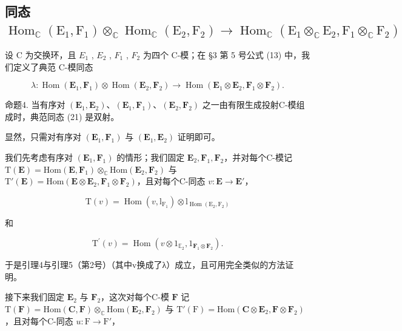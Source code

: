 \subsection{\texorpdfstring{同态 \(\operatorname{Hom}_{\mathbb{C}}(\mathrm{E}_1, \mathrm{F}_1) \otimes_{\mathbb{C}} \operatorname{Hom}_{\mathbb{C}}(\mathrm{E}_2, \mathrm{F}_2) \to \operatorname{Hom}_{\mathbb{C}}(\mathrm{E}_1 \otimes_{\mathbb{C}} \mathrm{E}_2, \mathrm{F}_1 \otimes_{\mathbb{C}} \mathrm{F}_2)\)}{从 E1,F1 上的 Hom 与 E2,F2 上的 Hom 的 C 上张量积到相应张量积上的 Hom 的同态}}

设 C 为交换环，且 \(E_{1}\) , \(E_{2}\) , \(F_{1}\) , \(F_{2}\) 为四个 C-模；在 §3 第 5 号公式 (13) 中，我们定义了典范 C-模同态

\[
\lambda : \operatorname{Hom} (\mathbf {E} _ {1}, \mathbf {F} _ {1}) \otimes \operatorname{Hom} (\mathbf {E} _ {2}, \mathbf {F} _ {2}) \to \operatorname{Hom} (\mathbf {E} _ {1} \otimes \mathbf {E} _ {2}, \mathbf {F} _ {1} \otimes \mathbf {F} _ {2}). \tag {21}
\]

命题4. 当有序对 \((\mathbf{E}_1, \mathbf{E}_2)\)、\((\mathbf{E}_1, \mathbf{F}_1)\)、\((\mathbf{E}_2, \mathbf{F}_2)\) 之一由有限生成投射C-模组成时，典范同态 (21) 是双射。

显然，只需对有序对 \((\mathbf{E}_{1}, \mathbf{F}_{1})\) 与 \((\mathbf{E}_{1}, \mathbf{E}_{2})\) 证明即可。

我们先考虑有序对 \((\mathbf{E}_1, \mathbf{F}_1)\) 的情形；我们固定 \(\mathbf{E}_2, \mathbf{F}_1, \mathbf{F}_2\)，并对每个C-模记 \(\mathrm{T}(\mathbf{E}) = \mathrm{Hom}(\mathbf{E}, \mathbf{F}_1) \otimes_{\mathbb{C}} \mathrm{Hom}(\mathbf{E}_2, \mathbf{F}_2)\) 与 \(\mathrm{T}'(\mathbf{E}) = \mathrm{Hom}(\mathbf{E} \otimes \mathbf{E}_2, \mathbf{F}_1 \otimes \mathbf{F}_2)\)，且对每个C-同态 \(v: \mathbf{E} \to \mathbf{E}'\)，

\[
\mathrm{T} (v) = \operatorname{Hom} (v, \mathrm{l} _ {\mathrm{F} _ {1}}) \otimes \mathrm{l} _ {\operatorname{Hom} (\mathrm{E} _ {2}, \mathrm{F} _ {2})}
\]

和

\[
\mathrm{T} ^ {\prime} (v) = \operatorname{Hom} (v \otimes 1 _ {\mathbb {E} _ {2}}, 1 _ {\mathbf {F} _ {1} \otimes \mathbf {F} _ {2}}).
\]

于是引理4与引理5（第2号）（其中v换成了λ）成立，且可用完全类似的方法证明。

接下来我们固定 \(\mathbf{E}_2\) 与 \(\mathbf{F}_2\)，这次对每个C-模 \(\mathbf{F}\) 记 \(\mathrm{T}(\mathbf{F}) = \mathrm{Hom}(\mathbf{C},\mathbf{F})\otimes_{\mathbb{C}}\mathrm{Hom}(\mathbf{E}_2,\mathbf{F}_2)\) 与 \(\mathrm{T}'(\mathrm{F}) = \mathrm{Hom}(\mathbf{C}\otimes \mathbf{E}_2,\mathbf{F}\otimes \mathbf{F}_2)\)，且对每个C-同态 \(u:\mathrm{F}\to \mathrm{F}'\)，

